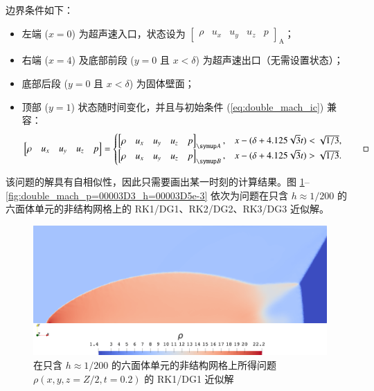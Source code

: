 \begin{problem}
边界条件如下：
\begin{itemize}[wide]
\item 左端 ($x=0$) 为超声速入口，状态设为 $\begin{bmatrix}\rho & u_{x} & u_{y} & u_{z} & p\end{bmatrix}_{\mathrm{A}}$；
\item 右端 ($x=4$) 及底部前段 ($y=0$ 且 $x<\delta$) 为超声速出口（无需设置状态）；
\item 底部后段 ($y=0$ 且 $x<\delta$) 为固体壁面；
\item 顶部 ($y=1$) 状态随时间变化，并且与初始条件 (\ref{eq:double_mach_ic}) 兼容：
\begin{equation}
\begin{bmatrix}\rho & u_{x} & u_{y} & u_{z} & p\end{bmatrix}=\begin{cases}
\begin{bmatrix}\rho & u_{x} & u_{y} & u_{z} & p\end{bmatrix}_{\mathrm{A}}, & x-(\delta+4.125\sqrt{3}t)<\sqrt{1/3},\\
\begin{bmatrix}\rho & u_{x} & u_{y} & u_{z} & p\end{bmatrix}_{\mathrm{B}}, & x-(\delta+4.125\sqrt{3}t)>\sqrt{1/3}.
\end{cases}\qedhere
\end{equation}
\end{itemize}
\end{problem}

该问题的解具有自相似性，因此只需要画出某一时刻的计算结果。图 \ref{fig:double_mach_p=00003D1_h=00003D5e-3}–\ref{fig:double_mach_p=00003D3_h=00003D5e-3}
依次为问题在只含 $h\approx1/200$
的六面体单元的非结构网格上的 RK1/DG1、RK2/DG2、RK3/DG3 近似解。

\begin{figure}[h!]
\begin{centering}
\includegraphics[width=1\textwidth]{../mdpi/figures/double_mach/p=1_h=5e-3}
\par\end{centering}
\caption{\label{fig:double_mach_p=00003D1_h=00003D5e-3}在只含 $h\approx1/200$
的六面体单元的非结构网格上所得问题
$\rho(x,y,z=Z/2,t=0.2)$ 的 RK1/DG1 近似解}
\end{figure}


